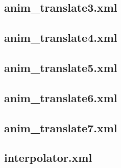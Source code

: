 \documentclass[11pt,a4j]{jarticle}
\begin{document}
\subsection{anim\_translate3.xml}
	
	\newpage
\subsection{anim\_translate4.xml}
	
	\newpage
\subsection{anim\_translate5.xml}
	
	\newpage
\subsection{anim\_translate6.xml}
	
	\newpage
\subsection{anim\_translate7.xml}
	
	\newpage
\subsection{interpolator.xml}
	
	\newpage
	
\end{document}
